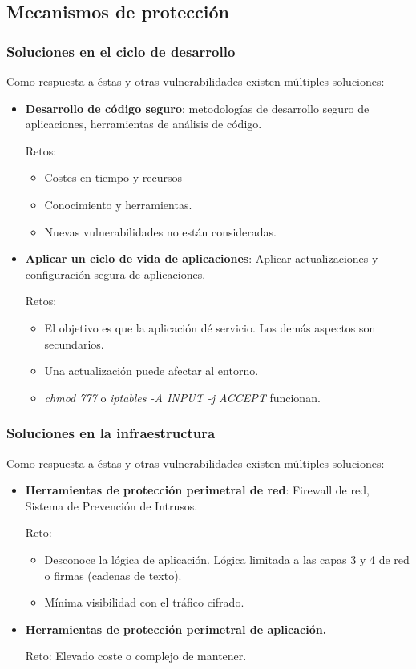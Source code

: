 \subsection{Mecanismos de protección}
\begin{frame}[shrink]
  \frametitle{Soluciones en el ciclo de desarrollo}
  Como respuesta a éstas y otras vulnerabilidades existen múltiples soluciones:
  \begin{itemize}
    \item {\bf Desarrollo de código seguro}: metodologías de desarrollo seguro de aplicaciones, herramientas de análisis de código.
      \par Retos:
      \begin{itemize}
        \item Costes en tiempo y recursos
        \item Conocimiento y herramientas.
        \item Nuevas vulnerabilidades no están consideradas.
      \end{itemize}
    \item {\bf Aplicar un ciclo de vida de aplicaciones}: Aplicar actualizaciones y configuración segura de aplicaciones.
      \par Retos:
      \begin{itemize}
        \item El objetivo es que la aplicación dé servicio. Los demás aspectos son secundarios.
        \item Una actualización puede afectar al entorno.
        \item {\em chmod 777} o {\em iptables -A INPUT -j ACCEPT} funcionan.
      \end{itemize}
  \end{itemize}
\end{frame}

\begin{frame}[shrink]
  \frametitle{Soluciones en la infraestructura}
  Como respuesta a éstas y otras vulnerabilidades existen múltiples soluciones:
  \begin{itemize}
    \item {\bf Herramientas de protección perimetral de red}: Firewall de red, Sistema de Prevención de Intrusos.
      \par Reto:
      \begin{itemize}
        \item Desconoce la lógica de aplicación. Lógica limitada a las capas 3 y 4 de red o firmas (cadenas de texto).
        \item Mínima visibilidad con el tráfico cifrado.
      \end{itemize}
    \item {\bf Herramientas de protección perimetral de aplicación.}
      \par Reto: Elevado coste o complejo de mantener.
  \end{itemize}
\end{frame}


